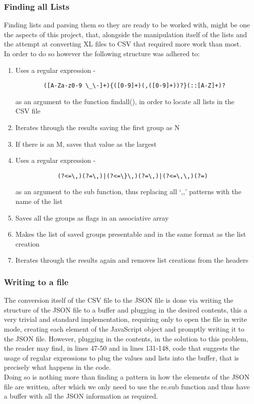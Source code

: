 \documentclass[11pt,a4paper,times]{report}
\def\JS{JavaScript\xspace}
\begin{document}
\subsubsection*{Finding all Lists} Finding lists and parsing them so they
are ready to be worked with, might be one the aspects of this project,
that, alongside the manipulation itself of the lists and the attempt at
converting XL files to CSV that required more work than most. \\
In order to do so however the following structure was adhered to:
\begin{enumerate}
    \item{Uses a regular expression - 
        \begin{verbatim}
        ([A-Za-z0-9 \_\-]+){([0-9]+)(,([0-9]+))?}(::[A-Z]+)?
        \end{verbatim}
        as an argument to the function findall(), in order to locate 
        all lists in the CSV file}
    \item{Iterates through the results saving the first group as N}
    \item{If there is an M, saves that value as the largest}
    \item{Uses a regular expression -
        \begin{verbatim}
            (?<=\,)(?=\,)|(?<=\}\,)(?=\,)|(?<=\,\,)(?=)
        \end{verbatim}
        as an argument to the sub function, thus replacing all 
        `,,' patterns with the name of the list}
    \item{Saves all the groups as flags in an associative array}
    \item{Makes the list of saved groups presentable and in the same
        format as the list creation}
    \item{Iterates through the results again and removes list creations
        from the headers}
\end{enumerate}
\subsubsection*{Writing to a file} The conversion itself of the CSV file
to the JSON file is done via writing the structure of the JSON file to a buffer
and plugging in the desired contents, this a very trivial and standard
implementation, requiring only to open the file in write mode, creating
each element of the \JS object and promptly writing it to the JSON file.
However, plugging in the contents, in the solution to this problem, the reader
may find, in lines 47-50 and in lines 131-148, code that suggests the usage of
regular expressions to plug the values and lists into the buffer, that is precisely
what happens in the code.\\
Doing so is nothing more than finding a pattern in how the elements of the JSON file
are written, after which we only need to use the re.sub function and thus have a 
buffer with all the JSON information as required.
\end{document}
